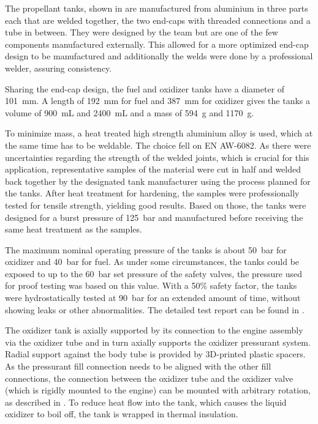 The propellant tanks, shown in  are manufactured from aluminium in three parts each that are welded together, the two end-caps with threaded connections and a tube in between. They were designed by the team but are one of the few components manufactured externally. This allowed for a more optimized end-cap design to be manufactured and additionally the welds were done by a professional welder, assuring consistency.

Sharing the end-cap design, the fuel and oxidizer tanks have a diameter of \SI{101}{\milli\meter}. A length of \SI{192}{\milli\meter} for fuel and \SI{387}{\milli\meter} for oxidizer gives the tanks a volume of \SI{900}{\milli\liter} and  \SI{2400}{\milli\liter} and a mass of \SI{594}{\gram} and \SI{1170}{\gram}.

To minimize mass, a heat treated high strength aluminium alloy is used, which at the same time has to be weldable. The choice fell on EN AW-6082. As there were uncertainties regarding the strength of the welded joints, which is crucial for this application, representative samples of the material were cut in half and welded back together by the designated tank manufacturer using the process planned for the tanks. After heat treatment for hardening, the samples were professionally tested for tensile strength, yielding good results. Based on those, the tanks were designed for a burst pressure of \SI{125}{\bar} and manufactured before receiving the same heat treatment as the samples.

The maximum nominal operating pressure of the tanks is about \SI{50}{\bar} for oxidizer and \SI{40}{\bar} for fuel. As under some circumstances, the tanks could be exposed to up to the \SI{60}{\bar} set pressure of the safety valves, the pressure used for proof testing was based on this value. With a 50\% safety factor, the tanks were hydrostatically tested at \SI{90}{\bar} for an extended amount of time, without showing leaks or other abnormalities. The detailed test report can be found in .

The oxidizer tank is axially supported by its connection to the engine assembly via the oxidizer tube and in turn axially supports the oxidizer pressurant system. Radial support against the body tube is provided by 3D-printed plastic spacers. As the pressurant fill connection needs to be aligned with the other fill connections, the connection between the oxidizer tube and the oxidizer valve (which is rigidly mounted to the engine) can be mounted with arbitrary rotation, as described in . To reduce heat flow into the tank, which causes the liquid oxidizer to boil off, the tank is wrapped in thermal insulation.

